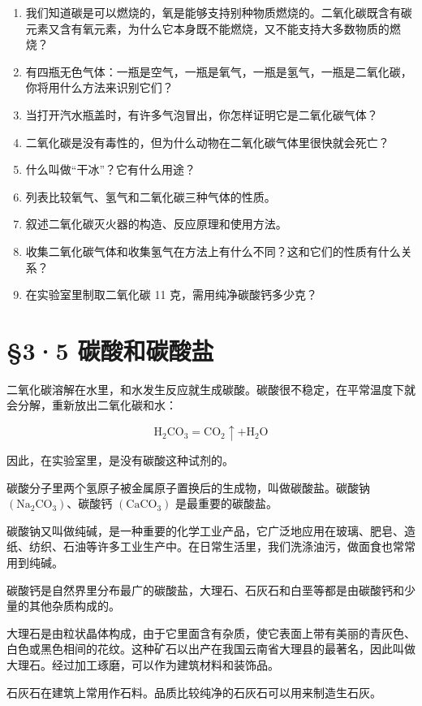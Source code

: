 \begin{enumerate}
\item
  我们知道碳是可以燃烧的，氧是能够支持别种物质燃烧的。二氧化碳既含有碳元素又含有氧元素，为什么它本身既不能燃烧，又不能支持大多数物质的燃烧？
\item
  有四瓶无色气体：一瓶是空气，一瓶是氧气，一瓶是氢气，一瓶是二氧化碳，你将用什么方法来识别它们？
\item
  当打开汽水瓶盖时，有许多气泡冒出，你怎样证明它是二氧化碳气体？
\item
  二氧化碳是没有毒性的，但为什么动物在二氧化碳气体里很快就会死亡？
\item
  什么叫做``干冰''？它有什么用途？
\item
  列表比较氧气、氢气和二氧化碳三种气体的性质。
\item
  叙述二氧化碳灭火器的构造、反应原理和使用方法。
\item
  收集二氧化碳气体和收集氢气在方法上有什么不同？这和它们的性质有什么关系？
\item
  在实验室里制取二氧化碳 11 克，需用纯净碳酸钙多少克？
\end{enumerate}

\section{§3·5 碳酸和碳酸盐}

二氧化碳溶解在水里，和水发生反应就生成碳酸。碳酸很不稳定，在平常温度下就会分解，重新放出二氧化碳和水：

\[
\mathrm{H}_{2} \mathrm{CO}_{3} = \mathrm{CO}_{2} \uparrow + \mathrm{H}_{2} \mathrm{O}
\]

因此，在实验室里，是没有碳酸这种试剂的。

碳酸分子里两个氢原子被金属原子置换后的生成物，叫做碳酸盐。碳酸钠
\(\left(\mathrm{Na}_{2}\mathrm{CO}_{3}\right)\)、碳酸钙
\(\left(\mathrm{CaCO}_{3}\right)\) 是最重要的碳酸盐。

碳酸钠又叫做纯碱，是一种重要的化学工业产品，它广泛地应用在玻璃、肥皂、造纸、纺织、石油等许多工业生产中。在日常生活里，我们洗涤油污，做面食也常常用到纯碱。

碳酸钙是自然界里分布最广的碳酸盐，大理石、石灰石和白垩等都是由碳酸钙和少量的其他杂质构成的。

大理石是由粒状晶体构成，由于它里面含有杂质，使它表面上带有美丽的青灰色、白色或黑色相间的花纹。这种矿石以出产在我国云南省大理县的最著名，因此叫做大理石。经过加工琢磨，可以作为建筑材料和装饰品。

石灰石在建筑上常用作石料。品质比较纯净的石灰石可以用来制造生石灰。

